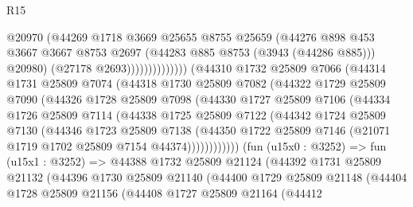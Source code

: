 \begin{lexlean}{R15}
\begin{coremodule}
                                @20970
                                (@44269
                                  @1718
                                  @3669
                                  @25655
                                  @8755
                                  @25659
                                  (@44276
                                    @898
                                    @453
                                    @3667
                                    @3667
                                    @8753
                                    @2697
                                    (@44283 @885 @8753 (@3943 (@44286 @885)))
                                    @20980)
                                  (@27178 @2693))))))))))))))
        (@44310
          @1732
          @25809
          @7066
          (@44314
            @1731
            @25809
            @7074
            (@44318
              @1730
              @25809
              @7082
              (@44322
                @1729
                @25809
                @7090
                (@44326
                  @1728
                  @25809
                  @7098
                  (@44330
                    @1727
                    @25809
                    @7106
                    (@44334
                      @1726
                      @25809
                      @7114
                      (@44338
                        @1725
                        @25809
                        @7122
                        (@44342
                          @1724
                          @25809
                          @7130
                          (@44346
                            @1723
                            @25809
                            @7138
                            (@44350
                              @1722
                              @25809
                              @7146
                              (@21071 @1719 @1702 @25809 @7154 @44374))))))))))))
        (fun (u15x0 : @3252) =>
        fun (u15x1 : @3252) =>
        @44388
          @1732
          @25809
          @21124
          (@44392
            @1731
            @25809
            @21132
            (@44396
              @1730
              @25809
              @21140
              (@44400
                @1729
                @25809
                @21148
                (@44404
                  @1728
                  @25809
                  @21156
                  (@44408
                    @1727
                    @25809
                    @21164
                    (@44412

\end{coremodule}
\end{lexlean}
